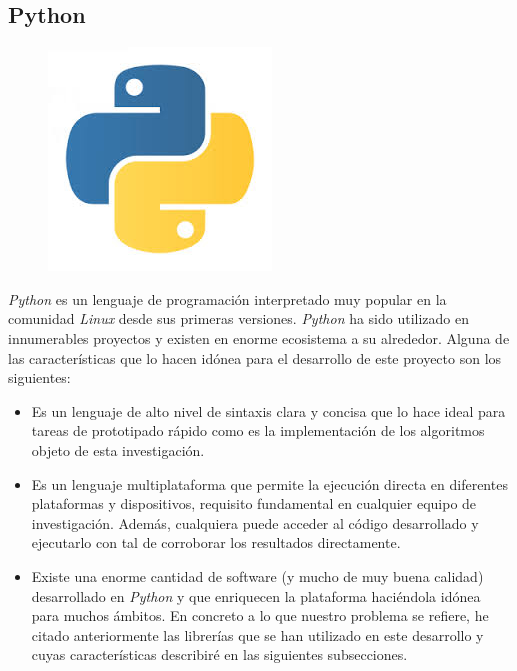 \documentclass[10pt,a4paper]{report}
\begin{document}
\subsection{Python\cite{PythonDoc2014}}
\begin{figure}[!hb]{}
    \centering
    \includegraphics[scale=0.3]{img/logoPython.jpg}
\end{figure}
\textit{Python} es un lenguaje de programación interpretado muy popular en la comunidad \textit{Linux} desde sus primeras versiones. \textit{Python} ha sido utilizado en innumerables proyectos y existen en enorme ecosistema a su alrededor. Alguna de las características que lo hacen idónea para el desarrollo de este proyecto son los siguientes:
\begin{itemize}
	\item Es un lenguaje de alto nivel de sintaxis clara y concisa que lo hace ideal para tareas de prototipado rápido como es la implementación de los algoritmos objeto de esta investigación.
	\item Es un lenguaje multiplataforma que permite la ejecución directa en diferentes plataformas y dispositivos, requisito fundamental en cualquier equipo de investigación. Además, cualquiera puede acceder al código desarrollado y ejecutarlo con tal de corroborar los resultados directamente.
	\item Existe una enorme cantidad de software (y mucho de muy buena calidad) desarrollado en \textit{Python} y que enriquecen la plataforma haciéndola idónea para muchos ámbitos. En concreto a lo que nuestro problema se refiere, he citado anteriormente las librerías que se han utilizado en este desarrollo y cuyas características describiré en las siguientes subsecciones.
\end{itemize}
\pagebreak
\end{document}
